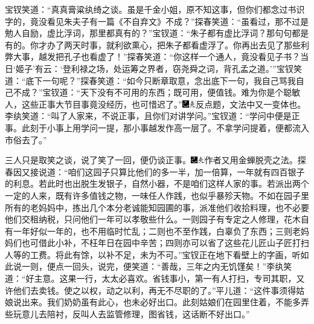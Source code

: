 宝钗笑道：“真真膏粱纨绮之谈。虽是千金小姐，原不知这事，但你们都念过书识字的，竟没看见朱夫子有一篇《不自弃文》不成？”探春笑道：“虽看过，那不过是勉人自励，虚比浮词，那里都真有的？”宝钗道：“朱子都有虚比浮词？那句句都是有的。你才办了两天时事，就利欲熏心，把朱子都看虚浮了。你再出去见了那些利弊大事，越发把孔子也看虚了！”探春笑道：“你这样一个通人，竟没看见子书？当日‘姬子’有云：‘登利禄之场，处运筹之界者，窃尧舜之词，背孔孟之道。’”宝钗笑道：“底下一句呢？”探春笑道：“如今只断章取意，念出底下一句，我自己骂我自己不成？”宝钗道：“天下没有不可用的东西；既可用，便值钱。难为你是个聪敏人，这些正事大节目事竟没经历，也可惜迟了。”{\includegraphics[width=3mm]{../Images/00003}\includegraphics[width=3mm]{../Images/00012}\footnotesize \kaishu 反点题，文法中又一变体也。}李纨笑道：“叫了人家来，不说正事，且你们对讲学问。”宝钗道：“学问中便是正事。此刻于小事上用学问一提，那小事越发作高一层了。不拿学问提着，便都流入市俗去了。”

三人只是取笑之谈，说了笑了一回，便仍谈正事。{\includegraphics[width=3mm]{../Images/00003}\includegraphics[width=3mm]{../Images/00012}\footnotesize \kaishu 作者又用金蝉脱壳之法。}探春因又接说道：“咱们这园子只算比他们的多一半，加一倍算，一年就有四百银子的利息。若此时也出脱生发银子，自然小器，不是咱们这样人家的事。若派出两个一定的人来，既有许多值钱之物，一味任人作践，也似乎暴殄天物。不如在园子里所有的老妈妈中，拣出几个本分老诚能知园圃的事，派准他们收拾料理，也不必要他们交租纳税，只问他们一年可以孝敬些什么。一则园子有专定之人修理，花木自有一年好似一年的，也不用临时忙乱；二则也不至作践，白辜负了东西；三则老妈妈们也可借此小补，不枉年日在园中辛苦；四则亦可以省了这些花儿匠山子匠打扫人等的工费。将此有馀，以补不足，未为不可。”宝钗正在地下看壁上的字画，听如此说一则，便点一回头，说完，便笑道：“善哉，三年之内无饥馑矣！”李纨笑道：“好主意。这果一行，太太必喜欢。省钱事小，第一有人打扫，专司其职，又许他们去卖钱。使之以权，动之以利，再无不尽职的了。”平儿道：“这件事须得姑娘说出来。我们奶奶虽有此心，也未必好出口。此刻姑娘们在园里住着，不能多弄些玩意儿去陪衬，反叫人去监管修理，图省钱，这话断不好出口。”

